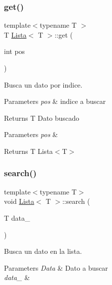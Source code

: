 \subsubsection{\texorpdfstring{get()}{get()}}
{\footnotesize\ttfamily template$<$typename T $>$ \\
T \hyperlink{classLista}{Lista}$<$ T $>$\+::get (\begin{DoxyParamCaption}\item[{int}]{pos }\end{DoxyParamCaption})}



Busca un dato por indice. 


\begin{DoxyParams}{Parameters}
{\em pos} & indice a buscar \\
\hline
\end{DoxyParams}
\begin{DoxyReturn}{Returns}
T Dato buscado
\end{DoxyReturn}

\begin{DoxyParams}{Parameters}
{\em pos} & \\
\hline
\end{DoxyParams}
\begin{DoxyReturn}{Returns}
T Lista$<$\+T$>$ 
\end{DoxyReturn}
\mbox{\label{classLista_a8539edb8abc0d862bdd366169f277ca0}} 
\subsubsection{\texorpdfstring{search()}{search()}}
{\footnotesize\ttfamily template$<$typename T$>$ \\
void \hyperlink{classLista}{Lista}$<$ T $>$\+::search (\begin{DoxyParamCaption}\item[{T}]{data\+\_\+ }\end{DoxyParamCaption})}



Busca un dato en la lista. 


\begin{DoxyParams}{Parameters}
{\em Data} & Dato a buscar\\
\hline
{\em data\+\_\+} & \\
\hline
\end{DoxyParams}


